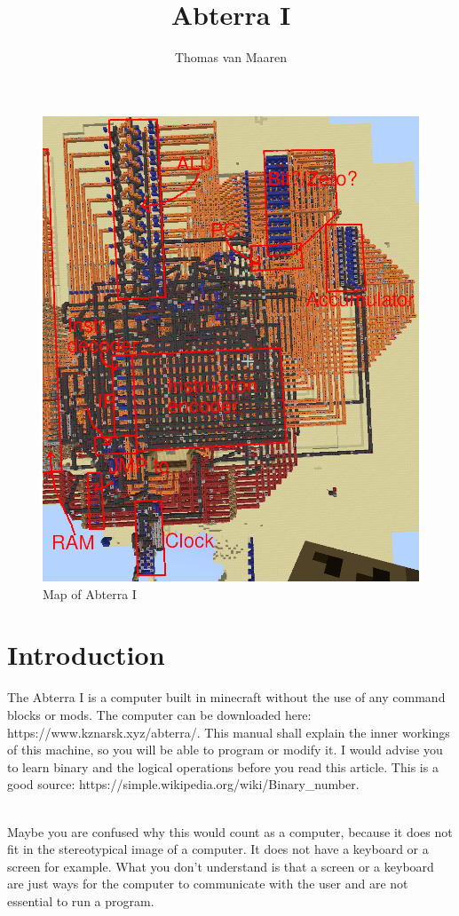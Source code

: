 \documentclass{article}
\title{Abterra I}
\author{Thomas van Maaren}
\newcommand{\Website}{https://www.kznarsk.xyz/abterra/}
\newcommand{\BinaryWebsite}{https://simple.wikipedia.org/wiki/Binary\_number}
\begin{document}
\maketitle

\begin{figure}
	\includegraphics[width=\textwidth]{map.png}
	\caption{Map of Abterra I}
\end{figure}
\section{Introduction}
The Abterra I is a computer built in minecraft without the use of any command blocks or mods. The computer can be downloaded here: \Website. This manual shall explain the inner workings of this machine, so you will be able to program or modify it. I would advise you to learn binary and the logical operations before you read this article. This is a good source: \BinaryWebsite. %

~\\
Maybe you are confused why this would count as a computer, because it does not fit in the stereotypical image of a computer. It does not have a keyboard or a screen for example. What you don't understand is that a screen or a keyboard are just ways for the computer to communicate with the user and are not essential to run a program.
\end{document}
